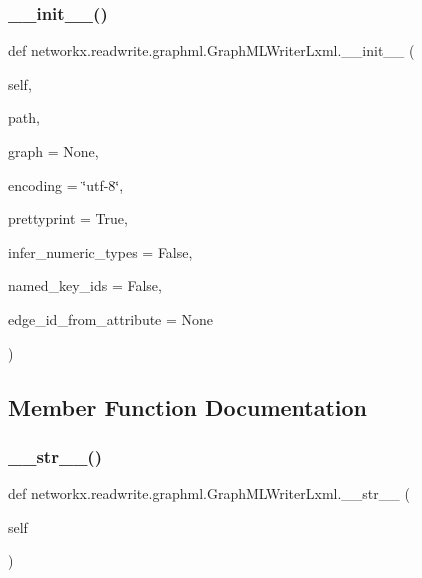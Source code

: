 \subsubsection{\texorpdfstring{\+\_\+\+\_\+init\+\_\+\+\_\+()}{\_\_init\_\_()}}
{\footnotesize\ttfamily def networkx.\+readwrite.\+graphml.\+Graph\+M\+L\+Writer\+Lxml.\+\_\+\+\_\+init\+\_\+\+\_\+ (\begin{DoxyParamCaption}\item[{}]{self,  }\item[{}]{path,  }\item[{}]{graph = {\ttfamily None},  }\item[{}]{encoding = {\ttfamily \char`\"{}utf-\/8\char`\"{}},  }\item[{}]{prettyprint = {\ttfamily True},  }\item[{}]{infer\+\_\+numeric\+\_\+types = {\ttfamily False},  }\item[{}]{named\+\_\+key\+\_\+ids = {\ttfamily False},  }\item[{}]{edge\+\_\+id\+\_\+from\+\_\+attribute = {\ttfamily None} }\end{DoxyParamCaption})}



\subsection{Member Function Documentation}
\mbox{\label{classnetworkx_1_1readwrite_1_1graphml_1_1GraphMLWriterLxml_a3a3556250963d510eb6f6b4e1217bd55}} 
\subsubsection{\texorpdfstring{\+\_\+\+\_\+str\+\_\+\+\_\+()}{\_\_str\_\_()}}
{\footnotesize\ttfamily def networkx.\+readwrite.\+graphml.\+Graph\+M\+L\+Writer\+Lxml.\+\_\+\+\_\+str\+\_\+\+\_\+ (\begin{DoxyParamCaption}\item[{}]{self }\end{DoxyParamCaption})}

